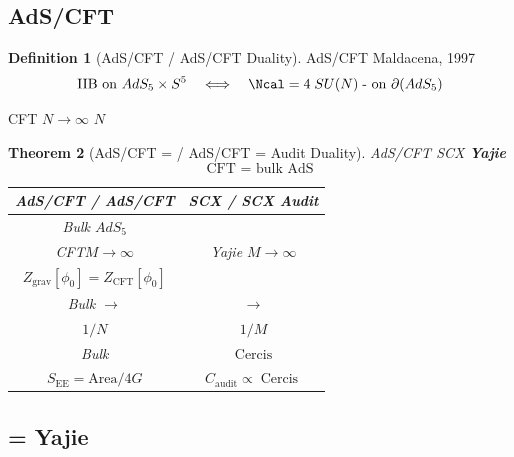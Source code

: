 \documentclass[12pt,a4paper]{article}
\theoremstyle{plain}
\newtheorem{theorem}{ Theorem}[section]
\theoremstyle{definition}
\newtheorem{definition}[theorem]{ Definition}
\DeclareMathOperator{\Cercis}{Cercis}
\begin{document}
\subsection{AdS/CFT }

\begin{definition}[AdS/CFT  / AdS/CFT Duality]
AdS/CFT Maldacena, 1997
\begin{equation}
    \text{IIB  on } AdS_5 \times S^5
    \quad \Longleftrightarrow \quad
    \Ncal = 4 \; SU(N) \; \text{- on } \partial(AdS_5)
\end{equation}

 CFT  $N \to \infty$  $N$ 
\end{definition}

\begin{theorem}[AdS/CFT =  / AdS/CFT = Audit Duality]
\label{thm:adscft_audit}
AdS/CFT \textbf{} SCX \textbf{Yajie }
\begin{equation}
    \text{ CFT =  bulk AdS }
\end{equation}

\textbf{}
\begin{center}
\begin{tabular}{c|c}
    \toprule
    \textbf{AdS/CFT / AdS/CFT} & \textbf{SCX  / SCX Audit} \\
    \midrule
    Bulk $AdS_5$  &  \\
     CFT$M \to \infty$ & Yajie $M \to \infty$  \\
     $Z_{\text{grav}}[\phi_0] = Z_{\text{CFT}}[\phi_0]$ &  \\
    Bulk  $\to$  &  $\to$  \\
    $1/N$  & $1/M$  \\
    Bulk  &  $\Cercis$ \\
     $S_{\text{EE}} = \text{Area}/4G$ &  $C_{\text{audit}} \propto \Cercis$ \\
    \bottomrule
\end{tabular}
\end{center}
\end{theorem}


\subsection{ = Yajie }
\end{document}
